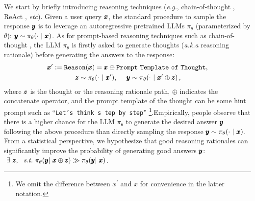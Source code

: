 We start by briefly introducing reasoning techniques (\textit{e.g.}, chain-of-thought \citep{DBLP:conf/nips/Wei0SBIXCLZ22}, ReAct \citep{DBLP:conf/iclr/YaoZYDSN023}, \textit{etc}).
Given a user query $\pmb{x}$, the standard procedure to sample the response $\pmb{y}$ is to leverage an autoregressive pretrained LLMs $\pi_\theta$ (parameterized by $\theta$): $\pmb{y} \sim \pi_\theta (\cdot ~|~ \pmb{x})$.
As for prompt-based reasoning techniques such as chain-of-thought \citep{DBLP:conf/nips/Wei0SBIXCLZ22},
the LLM $\pi_\theta$ is firstly asked to generate thoughts (\textit{a.k.a} reasoning rationale) before generating the answers to the response:
\begin{align*}
    \pmb{x}^\prime := \texttt{Reason}(\pmb{x}) &= \pmb{x} \oplus \texttt{Prompt}~\texttt{Template}~\texttt{of}~\texttt{Thought},\\
    ~~~ \pmb{z} \sim \pi_\theta &(\cdot ~| ~\pmb{x}^\prime) ,~~~~\pmb{y} \sim \pi_\theta (\cdot ~| ~\pmb{x}^\prime \oplus \pmb{z})\,,
\end{align*}
where $\pmb{z}$ is the thought or the reasoning rationale path, $\oplus$ indicates the concatenate operator, and the prompt template of the thought can be some hint prompt such as ``\texttt{Let's think s
tep by step}'' \footnote{We omit the difference between $x^\prime$ and $x$ for convenience in the latter notation.}.Empirically, people observe that there is a higher chance for the LLM $\pi_\theta$ to generate the desired answer $\pmb{y}$ following the above procedure than directly sampling the response $\pmb{y} \sim \pi_\theta(\cdot ~| ~\pmb{x})$.  
From a statistical perspective, we hypothesize that good reasoning rationales can significantly improve the probability of generating good answers $\pmb{y}$: $~\exists~ \pmb{z}, ~~\textit{s.t.}~ \pi_\theta(\pmb{y} |~\pmb{x} \oplus \pmb{z}) \gg \pi_\theta (\pmb{y} | ~\pmb{x})$.
